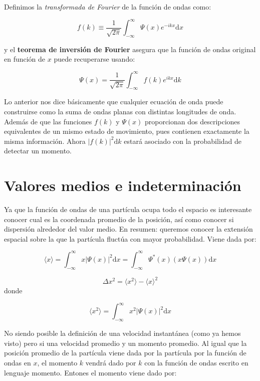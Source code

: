 \documentclass[12pt,a4paper]{article}
\numberwithin{equation}{section}
\numberwithin{figure}{section}
\newcommand{\D}{\mathrm{d}}
\newcommand{\intf}{\int_{-\infty}^{\infty}}
\begin{document}
Definimos la \textit{transformada de Fourier} de la función de ondas como:

\begin{equation}
f(k) \equiv \dfrac{1}{\sqrt{2 \pi}} \intf \Psi (x) e^{-ikx} \D x
\end{equation}

y el \textbf{teorema de inversión de Fourier} asegura que la función de ondas original en función de $x$ puede recuperarse usando:

\begin{equation}
\Psi (x) = \dfrac{1}{\sqrt{2 \pi}} \int_{-\infty}^{\infty} f(k) e^{ikx} \D k
\end{equation}

Lo anterior nos dice básicamente que cualquier ecuación de onda puede construirse como la suma de ondas planas con distintas longitudes de onda. Además de que las funciones $f(k)$ y $\Psi (x)$ proporcionan dos descripciones equivalentes de un mismo estado de movimiento, pues contienen exactamente la misma información. Ahora $|f(k)|^2 \D k$ estará asociado con la probabilidad de detectar un momento.

\section{Valores medios e indeterminación}

Ya que la función de ondas de una partícula ocupa todo el espacio es interesante conocer cual es la coordenada promedio de la posición, así como conocer si dispersión alrededor del valor medio. En resumen: queremos conocer la extensión espacial sobre la que la partícula fluctúa con mayor probabilidad. Viene dada por:

\begin{equation}
\langle x \rangle = \intf x |\Psi (x) |^2 \D x = \intf \Psi ^* (x) (x \Psi (x)) \D x
\end{equation}

\begin{equation}
\Delta x^2 = \langle x^2 \rangle - \langle x \rangle^2
\end{equation}
donde 

\begin{equation}
\langle x^2 \rangle = \intf x^2 |\Psi (x)|^2  \D x
\end{equation}

No siendo posible la definición de una velocidad instantánea (como ya hemos visto) pero si una velocidad promedio y un momento promedio. Al igual que la posición promedio de la partícula viene dada por la partícula por la función de ondas en $x$, el momento $k$ vendrá dado por $k$ con la función de ondas escrito en lenguaje momento. Entones el momento viene dado por:
\end{document}
